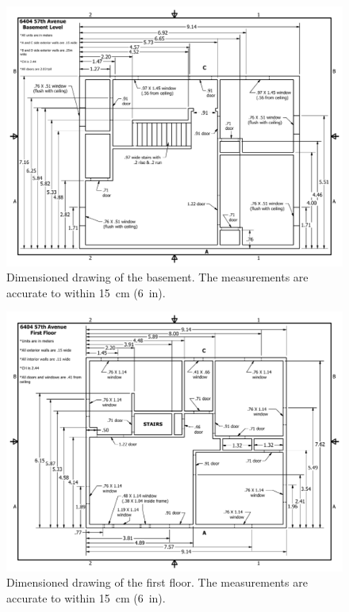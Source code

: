 \documentclass[12pt,oneside]{book}
\begin{document}
\begin{figure}[!ht]
\centering
\includegraphics[width=1\textwidth]{../Figures/Basement_Metric}
\caption[Dimensioned drawing of first floor.]{Dimensioned drawing of the basement. The measurements are accurate to within 15~cm (6~in).}
\label{fig:basement}
\end{figure}

\begin{figure}[!ht]
\centering
\includegraphics[width=1\textwidth]{../Figures/First_Floor_Metric}
\caption[Dimensioned drawing of second floor.]{Dimensioned drawing of the first floor. The measurements are accurate to within 15~cm (6~in).}
\label{fig:first_floor}
\end{figure}
\end{document}
